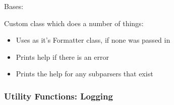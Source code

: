 \documentclass[letterpaper,10pt,english]{sphinxmanual}
\begin{document}
\begin{fulllineitems}
\label{pytan.utils:pytan.utils.CustomArgParse}
Bases: \href{http://docs.python.org/2.7/library/argparse.html\#argparse.ArgumentParser}{}

Custom \href{http://docs.python.org/2.7/library/argparse.html\#argparse.ArgumentParser}{} class which does a number of things:
\begin{itemize}
\item {} 
Uses {\hyperref[pytan.utils:pytan.utils.CustomArgFormat]{}} as it's Formatter class, if none was passed in

\item {} 
Prints help if there is an error

\item {} 
Prints the help for any subparsers that exist

\end{itemize}

\begin{fulllineitems}
\label{pytan.utils:pytan.utils.CustomArgParse.error}
\end{fulllineitems}


\begin{fulllineitems}
\label{pytan.utils:pytan.utils.CustomArgParse.print_help}
\end{fulllineitems}


\end{fulllineitems}



\subsubsection{Utility Functions: Logging}
\label{pytan.utils:utility-functions-logging}
\end{document}
